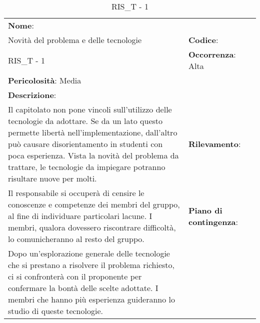 \renewcommand{\arraystretch}{1.5}
\begin{longtable} { 
		>{\raggedright}p{} 
		>{\raggedright}p{} 
		>{\raggedright}p{}    }
		
		\caption{RIS\_T - 1} \endhead	


	\textbf{Nome}: \\ Novità del problema e delle tecnologie
	& \textbf{Codice}: \\ RIS\_T - 1  
	& \textbf{Occorrenza}: Alta \\ \textbf{Pericolosità}: Media
	
	\tabularnewline
	
	\textbf{Descrizione}: \\ Il capitolato non pone vincoli sull'utilizzo delle tecnologie da adottare. Se da un lato questo permette libertà nell'implementazione, dall'altro può causare disorientamento in studenti con poca esperienza. Vista la novità del problema da trattare, le tecnologie da impiegare potranno risultare nuove per molti.
	& 
	\textbf{Rilevamento}: \\ Il responsabile si occuperà di censire le conoscenze e competenze dei membri del gruppo, al fine di individuare particolari lacune. I membri, qualora dovessero riscontrare difficoltà, lo comunicheranno al resto del gruppo. 	
	&  
	\textbf{Piano di contingenza}: \\ Dopo un'esplorazione generale delle tecnologie che si prestano a risolvere il problema richiesto, ci si confronterà con il proponente per confermare la bontà delle scelte adottate. I membri che hanno più esperienza guideranno lo studio di queste tecnologie.

\end{longtable}

\newpage



